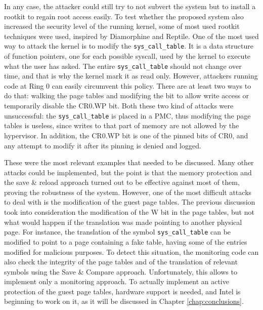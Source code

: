 In any case, the attacker could still try to not subvert the system but to install a rootkit to regain root access easily. To test whether the proposed system also increased the security level of the running kernel, some of most used rootkit techniques were used, inspired by Diamorphine and Reptile. One of the most used way to attack the kernel is to modify the \texttt{sys\_call\_table}. It is a data structure of function pointers, one for each possible syscall, used by the kernel to execute what the user has asked. The entire \texttt{sys\_call\_table} should not change over time, and that is why the kernel mark it as read only. However, attackers running code at Ring 0 can easily circumvent this policy. There are at least two ways to do that: walking the page tables and modifying the bit to allow write access or temporarily disable the CR0.WP bit. Both these two kind of attacks were unsuccessful:  the \texttt{sys\_call\_table} is placed in a PMC, thus modifying the page tables is useless, since writes to that part of memory are not allowed by the hypervisor. In addition, the CR0.WP bit is one of the pinned bits of CR0, and any attempt to modify it after its pinning is denied and logged. 

\par
These were the most relevant examples that needed to be discussed. Many other attacks could be implemented, but the point is that the memory protection and the save \& reload approach turned out to be effective against most of them, proving the robustness of the system. However, one of the most difficult attacks to deal with is the modification of the guest page tables. The previous discussion took into consideration the modification of the W bit in the page tables, but not what would happen if the translation was made pointing to another physical page. For instance, the translation of the symbol \texttt{sys\_call\_table} can be modified to point to a page containing a fake table, having some of the entries modified for malicious purposes. To detect this situation, the monitoring code can also check the integrity of the page tables and of the translation of relevant symbols using the Save \& Compare approach. Unfortunately, this allows to implement only a monitoring approach. To actually implement an active protection of the guest page tables, hardware support is needed, and Intel is beginning to work on it, as it will be discussed in Chapter \ref{chap:conclusions}.


